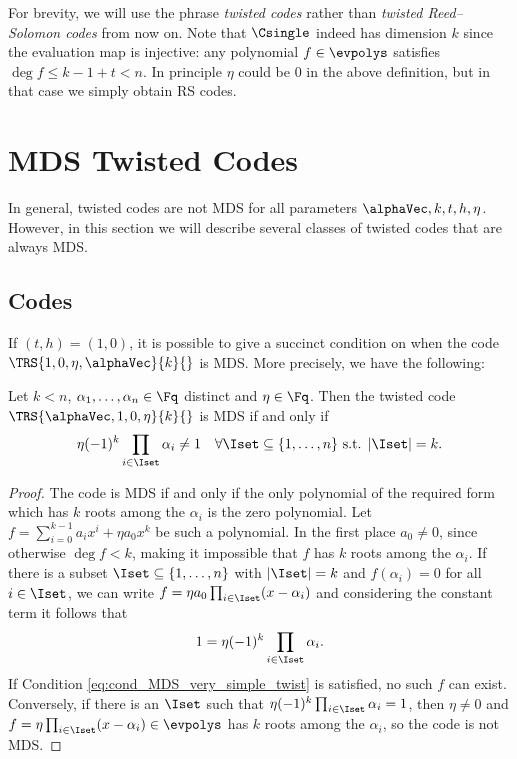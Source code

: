 \documentclass[conference,a4paper]{IEEEtran}
\begin{document}
For brevity, we will use the phrase \emph{twisted codes} rather than \emph{twisted Reed--Solomon codes} from now on.
Note that $\Csingle$ indeed has dimension $k$ since the evaluation map is injective: any polynomial $f \in \evpolys$ satisfies $\deg f \le k-1+t < n$. In principle $\eta$ could be $0$ in the above definition, but in that case we simply obtain RS codes.

\section{MDS Twisted Codes}
\label{sec:MDS_TRS_Codes}

In general, twisted codes are not MDS for all parameters $\alphaVec,k,t,h,\eta$. However, in this section we will describe several classes of twisted codes that are always MDS.


\subsection{\startw Codes}
\label{ssec:Max_Length_MDS_Primitively Twisted}

\noindent
If $(t,h)=(1,0)$, it is possible to give a succinct condition on when the code $\TRS{1,0,\eta,\alphaVec}{k}{}$ is MDS. More precisely, we have the following:
\begin{lemma}\label{lem:cond_MDS_very_simple_twist}
Let $k<n$, $\alpha_1,\dots,\alpha_n \in \Fq$ distinct and $\eta \in \Fq$. Then the twisted code $\TRS{\alphaVec,1,0,\eta}{k}{}$ is MDS if and only if
\begin{align}
\eta (-1)^k \prod_{i \in \Iset} \alpha_i \neq 1 \quad \forall \Iset \subseteq \{1,\dots,n\} \textrm{ s.t. } |\Iset|=k. \label{eq:cond_MDS_very_simple_twist}
\end{align}
\end{lemma}

\begin{proof}
The code is MDS if and only if the only polynomial of the required form which has $k$ roots among the $\alpha_i$ is the zero polynomial. Let $f = \sum_{i=0}^{k-1} a_i x^i + \eta a_0 x^k$ be such a polynomial. In the first place $a_0 \neq 0$, since otherwise $\deg f < k$, making it impossible that $f$ has $k$ roots among the $\alpha_i$. If there is a subset $\Iset \subseteq \{1,\dots,n\}$ with $|\Iset|=k$ and $f(\alpha_i) = 0$ for all $i \in \Iset$, we can write $f = \eta a_0 \prod_{i \in \Iset}(x-\alpha_i)$ and considering the constant term it follows that
\begin{align}
1 = \eta (-1)^k \prod_{i \in \Iset} \alpha_i. \label{eq:intermediate_step_MDS_very_simple_twist}
\end{align}
If Condition \eqref{eq:cond_MDS_very_simple_twist} is satisfied, no such $f$ can exist.
Conversely, if there is an $\Iset$ such that $\eta (-1)^k \prod_{i \in \Iset} \alpha_i = 1$, then $\eta\neq 0$ and $f = \eta \prod_{i \in \Iset}(x-\alpha_i) \in \evpolys$ has $k$ roots among the $\alpha_i$, so the code is not MDS.
\end{proof}
\end{document}
